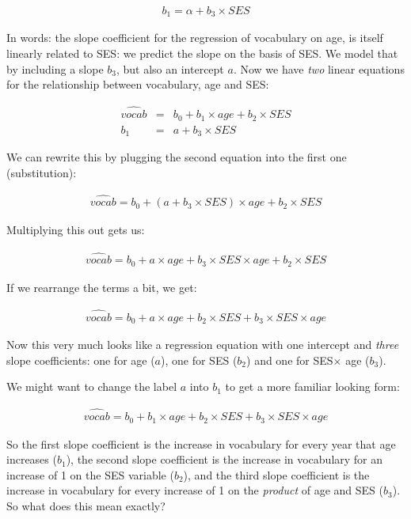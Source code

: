 \documentclass[]{report}\usepackage[]{graphicx}\usepackage[]{color}
\begin{document}
\begin{eqnarray}
b_1 = \alpha + b_3 \times SES
\end{eqnarray}

In words: the slope coefficient for the regression of vocabulary on age, is itself linearly related to SES: we predict the slope on the basis of SES. We model that by including a slope $b_3$, but also an intercept $a$. Now we have \textit{two} linear equations for the relationship between vocabulary, age and SES:

\begin{eqnarray}
\widehat{vocab} &=& b_0 + b_1 \times age + b_2 \times SES  \\
b_1 &=& a + b_3 \times SES
\end{eqnarray}

We can rewrite this by plugging the second equation into the first one (substitution):

\begin{eqnarray}
\widehat{vocab} = b_0 + (a + b_3 \times SES)  \times age + b_2 \times SES 
\end{eqnarray}


Multiplying this out gets us:

\begin{eqnarray}
\widehat{vocab} = b_0 + a \times age + b_3 \times SES  \times age + b_2 \times SES
\end{eqnarray}

If we rearrange the terms a bit, we get:

\begin{eqnarray}
\widehat{vocab} = b_0 + a \times age + b_2 \times SES + b_3 \times SES  \times age
\end{eqnarray}

Now this very much looks like a regression equation with one intercept and \textit{three} slope coefficients: one for age ($a$), one for SES ($b_2$) and one for SES$\times$ age ($b_3$).


We might want to change the label $a$ into $b_1$ to get a more familiar looking form:

\begin{eqnarray}
\widehat{vocab} = b_0 + b_1\times age + b_2 \times SES + b_3 \times SES  \times age
\end{eqnarray}

So the first slope coefficient is the increase in vocabulary for every year that age increases ($b_1$), the second slope coefficient is the increase in vocabulary for an increase of 1 on the SES variable ($b_2$), and the third slope coefficient is the increase in vocabulary for every increase of 1 on the \textit{product} of age and SES ($b_3$).
\\
So what does this mean exactly?
\end{document}
